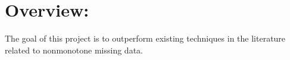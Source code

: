 \documentclass[12pt]{article}
\begin{document}

\section*{Overview:}

The goal of this project is to outperform existing techniques in the literature
related to nonmonotone missing data.















\printbibliography
\end{document}
